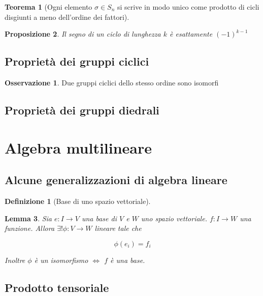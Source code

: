 \documentclass[11pt]{article}
\theoremstyle{plain}
\newtheorem{thm}{Teorema}[section]
\newtheorem{lemma}[thm]{Lemma}
\newtheorem{prop}[thm]{Proposizione}
\theoremstyle{definition}
\newtheorem{defn}{Definizione}[section]
\newtheorem*{rem}{Osservazione}
\theoremstyle{remark}
\begin{document}
\begin{thm}[Ogni elemento $\sigma \in S_n$ si scrive in modo unico come prodotto di cicli disgiunti a meno dell'ordine dei fattori]


\end{thm}

\begin{prop}Il segno di un ciclo di lunghezza $k$ è esattamente $(-1)^{k-1}$


\end{prop}



\subsection{Proprietà dei gruppi ciclici}

\begin{rem}
Due gruppi ciclici dello stesso ordine sono isomorfi
\end{rem}

\subsection{Proprietà dei gruppi diedrali}









\newpage
\section{Algebra multilineare}
\subsection{Alcune generalizzazioni di algebra lineare}

\begin{defn}[Base di uno spazio vettoriale]

\end{defn}


\begin{lemma}
 Sia $e:I\to V$ una base di $V$ e $W$ uno spazio vettoriale. $f: I \to W$ una funzione. Allora $\exists! \phi: V \to W$ lineare tale che

\[\phi(e_i) = f_i \]

Inoltre $\phi$ è un isomorfismo $\Leftrightarrow$ $f$ è una base.
\end{lemma}


\subsection{Prodotto tensoriale}
\end{document}
